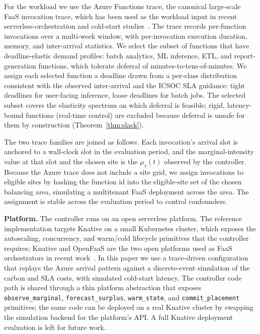 For the workload we use the Azure Functions trace, the canonical large-scale FaaS invocation trace, which has been used as the workload input in recent serverless-orchestration and cold-start studies~\cite{azurefunctions2019,roy2024codecrunch,yu2024rainbowcake,chen2024crossedge,khansari2024deep,chen2026cold,hong2024analysis}. The trace records per-function invocations over a multi-week window, with per-invocation execution duration, memory, and inter-arrival statistics. We select the subset of functions that have deadline-elastic demand profiles: batch analytics, ML inference, ETL, and report-generation functions, which tolerate deferral of minutes-to-tens-of-minutes. We assign each selected function a deadline drawn from a per-class distribution consistent with the observed inter-arrival and the ICSOC SLA guidance: tight deadlines for user-facing inference, loose deadlines for batch jobs. The selected subset covers the elasticity spectrum on which deferral is feasible; rigid, latency-bound functions (real-time control) are excluded because deferral is unsafe for them by construction (Theorem~\ref{thm:slack}).

The two trace families are joined as follows. Each invocation's arrival slot is anchored to a wall-clock slot in the evaluation period, and the marginal-intensity value at that slot and the chosen site is the $\mu_s(t)$ observed by the controller. Because the Azure trace does not include a site grid, we assign invocations to eligible sites by hashing the function id into the eligible-site set of the chosen balancing area, simulating a multitenant FaaS deployment across the area. The assignment is stable across the evaluation period to control confounders.

\textbf{Platform.}
The controller runs on an open serverless platform. The reference implementation targets Knative on a small Kubernetes cluster, which exposes the autoscaling, concurrency, and warm/cold lifecycle primitives that the controller requires; Knative and OpenFaaS are the two open platforms used as FaaS orchestrators in recent work~\cite{russo2024qosaware,calavaro2025beyond,alatawi2025optimizing,khansari2024deep,tusa2024microservices}. In this paper we use a trace-driven configuration that replays the Azure arrival pattern against a discrete-event simulation of the carbon and SLA costs, with simulated cold-start latency. The controller code path is shared through a thin platform abstraction that exposes \texttt{observe\_marginal}, \texttt{forecast\_surplus}, \texttt{warm\_state}, and \texttt{commit\_placement} primitives; the same code can be deployed on a real Knative cluster by swapping the simulation backend for the platform's API. A full Knative deployment evaluation is left for future work.


